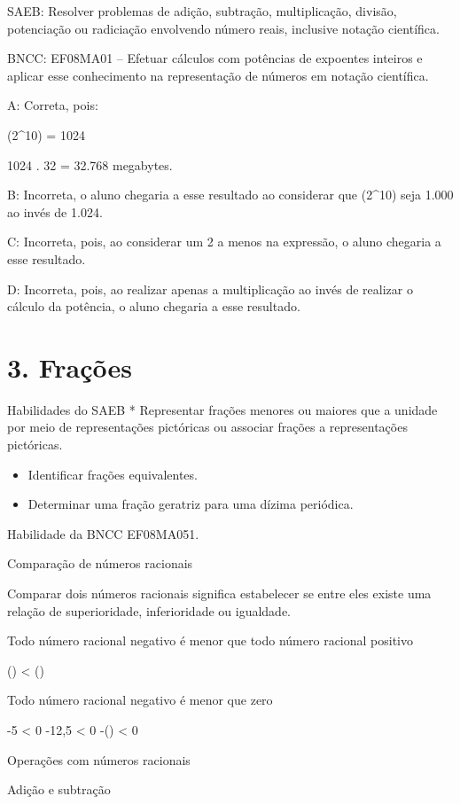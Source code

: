 SAEB: Resolver problemas de adição, subtração, multiplicação, divisão,
potenciação ou radiciação envolvendo número reais, inclusive notação
científica.

BNCC: EF08MA01 -- Efetuar cálculos com potências de expoentes inteiros e
aplicar esse conhecimento na representação de números em notação
científica.

A: Correta, pois:

(2^10) = 1024

1024 . 32 = 32.768 megabytes.

B: Incorreta, o aluno chegaria a esse resultado ao considerar que
(2^{10}) seja 1.000 ao invés de 1.024.

C: Incorreta, pois, ao considerar um 2 a menos na expressão, o aluno
chegaria a esse resultado.

D: Incorreta, pois, ao realizar apenas a multiplicação ao invés de
realizar o cálculo da potência, o aluno chegaria a esse resultado.


\section{3. Frações}

Habilidades do SAEB * Representar frações menores ou maiores que a
unidade por meio de representações pictóricas ou associar frações a
representações pictóricas.

\begin{itemize}
\item
  Identificar frações equivalentes.
\item
  Determinar uma fração geratriz para uma dízima periódica.
\end{itemize}

Habilidade da BNCC EF08MA051.

Comparação de números racionais

Comparar dois números racionais significa estabelecer se entre eles
existe uma relação de superioridade, inferioridade ou igualdade.

Todo número racional negativo é menor que todo número racional positivo

() \textless{} ()

Todo número racional negativo é menor que zero

-5 \textless{} 0 -12,5 \textless{} 0 -() \textless{} 0

Operações com números racionais

Adição e subtração

